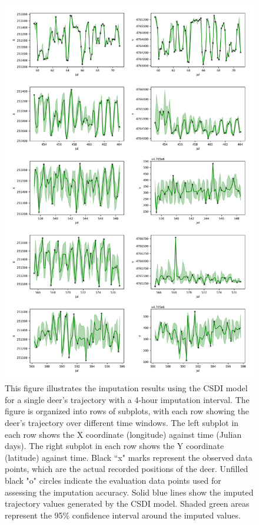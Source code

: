 \documentclass[11pt]{article}
\begin{document}
\begin{figure}[h]
  \centering
  \includegraphics[width=\textwidth]{../figure/5094_4_hour_trajectory_imputation} %
  \caption{This figure illustrates the imputation results using the CSDI model for a single deer's trajectory with a 4-hour imputation interval.  The figure is organized into rows of subplots, with each row showing the deer's trajectory over different time windows. The left subplot in each row shows the X coordinate (longitude) against time (Julian days). The right subplot in each row shows the Y coordinate (latitude) against time. Black ``x" marks represent the observed data points, which are the actual recorded positions of the deer. Unfilled black "o" circles indicate the evaluation data points used for assessing the imputation accuracy. Solid blue lines show the imputed trajectory values generated by the CSDI model. Shaded green areas represent the 95\% confidence interval around the imputed values.}
  \label{fig: csdi_aug} %
\end{figure}
\end{document}
